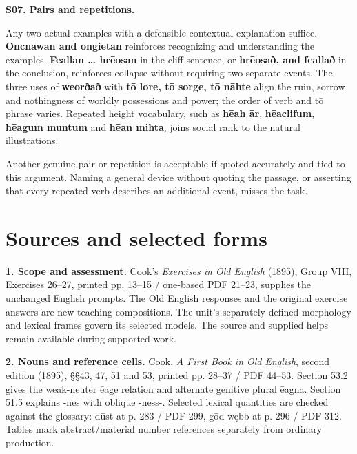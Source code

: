 \par\begin{minipage}{\linewidth}\raggedright
\textbf{S07. Pairs and repetitions.}

Any two actual examples with a defensible contextual explanation suffice. \textbf{Oncnāwan and ongietan} reinforces recognizing and understanding the examples. \textbf{Feallan … hrēosan} in the cliff sentence, or \textbf{hrēosað, and feallað} in the conclusion, reinforces collapse without requiring two separate events. The three uses of \textbf{weorðað} with \textbf{tō lore, tō sorge, tō nāhte} align the ruin, sorrow and nothingness of worldly possessions and power; the order of verb and tō phrase varies. Repeated height vocabulary, such as \textbf{hēah ār}, \textbf{hēaclifum}, \textbf{hēagum muntum} and \textbf{hēan mihta}, joins social rank to the natural illustrations.

Another genuine pair or repetition is acceptable if quoted accurately and tied to this argument. Naming a general device without quoting the passage, or asserting that every repeated verb describes an additional event, misses the task.

\end{minipage}\par\addvspace{4pt}

\clearpage
\section*{Sources and selected forms}

\begingroup\fontsize{10}{12.8}\selectfont
\textbf{1. Scope and assessment.} Cook's \emph{Exercises in Old English} (1895), Group VIII, Exercises 26–27, printed pp. 13–15 /\allowbreak{} one-based PDF 21–23, supplies the unchanged English prompts. The Old English responses and the original exercise answers are new teaching compositions. The unit's separately defined morphology and lexical frames govern its selected models. The source and supplied helps remain available during supported work.

\textbf{2. Nouns and reference cells.} Cook, \emph{A First Book in Old English}, second edition (1895), §§43, 47, 51 and 53, printed pp. 28–37 /\allowbreak{} PDF 44–53. Section 53.2 gives the weak-neuter ēage relation and alternate genitive plural ēagna. Section 51.5 explains -nes with oblique -ness-. Selected lexical quantities are checked against the glossary: dūst at p. 283 /\allowbreak{} PDF 299, gōd-wębb at p. 296 /\allowbreak{} PDF 312. Tables mark abstract/\allowbreak{}material number references separately from ordinary production.

